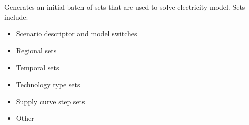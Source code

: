 \documentclass[letterpaper,10pt,english]{sphinxmanual}
\begin{document}
\begin{fulllineitems}
\label{\detokenize{src.models.electricity.scripts.preprocessor:src.models.electricity.scripts.preprocessor.Sets}}
\pysigstartsignatures
\pysiglinewithargsret
{}
{}
{}
\pysigstopsignatures
\sphinxAtStartPar
Generates an initial batch of sets that are used to solve electricity model. Sets include:
\begin{itemize}
\item {} 
\sphinxAtStartPar
Scenario descriptor and model switches

\item {} 
\sphinxAtStartPar
Regional sets

\item {} 
\sphinxAtStartPar
Temporal sets

\item {} 
\sphinxAtStartPar
Technology type sets

\item {} 
\sphinxAtStartPar
Supply curve step sets

\item {} 
\sphinxAtStartPar
Other

\end{itemize}

\end{fulllineitems}

\end{document}
